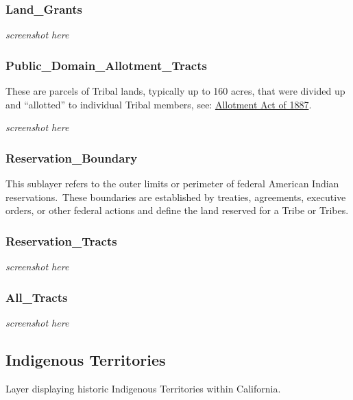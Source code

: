 \documentclass[
  letterpaper,
  DIV=11,
  numbers=noendperiod]{scrreprt}
\begin{document}
\subsubsection{Land\_Grants}\label{land_grants}

\emph{screenshot here}

\subsubsection{Public\_Domain\_Allotment\_Tracts}\label{public_domain_allotment_tracts}

These are parcels of Tribal lands, typically up to 160 acres, that were
divided up and ``allotted'' to individual Tribal members, see:
\href{https://www.bia.gov/bia/history/history-indian-land-consolidation\#:~:text=In\%201887\%2C\%20Congress\%20enacted\%20the,allotted\%E2\%80\%9D\%20to\%20individual\%20Tribal\%20members.}{Allotment
Act of 1887}.~

\emph{screenshot here}

\subsubsection{Reservation\_Boundary}\label{reservation_boundary}

This sublayer refers to the outer limits or perimeter of federal
American Indian reservations.~These boundaries are established by
treaties, agreements, executive orders, or other federal actions and
define the land reserved for a Tribe or Tribes.

\subsubsection{Reservation\_Tracts}\label{reservation_tracts}

\emph{screenshot here}

\subsubsection{All\_Tracts}\label{all_tracts}

\emph{screenshot here}

\subsection{Indigenous Territories}\label{indigenous-territories}

Layer displaying historic Indigenous Territories within California.
\end{document}
